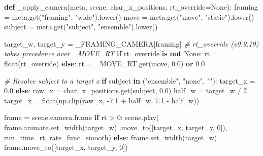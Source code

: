 \documentclass[
  12pt,
  letterpaper,
]{book}
\newenvironment{Shaded}{}{}
\newcommand{\BuiltInTok}[1]{\textcolor[rgb]{0.00,0.50,0.00}{#1}}
\newcommand{\CommentTok}[1]{\textcolor[rgb]{0.38,0.63,0.69}{\textit{#1}}}
\newcommand{\ControlFlowTok}[1]{\textcolor[rgb]{0.00,0.44,0.13}{\textbf{#1}}}
\newcommand{\DecValTok}[1]{\textcolor[rgb]{0.25,0.63,0.44}{#1}}
\newcommand{\FloatTok}[1]{\textcolor[rgb]{0.25,0.63,0.44}{#1}}
\newcommand{\KeywordTok}[1]{\textcolor[rgb]{0.00,0.44,0.13}{\textbf{#1}}}
\newcommand{\NormalTok}[1]{#1}
\newcommand{\OperatorTok}[1]{\textcolor[rgb]{0.40,0.40,0.40}{#1}}
\newcommand{\StringTok}[1]{\textcolor[rgb]{0.25,0.44,0.63}{#1}}
\newcommand{\VariableTok}[1]{\textcolor[rgb]{0.10,0.09,0.49}{#1}}
\begin{document}
\begin{Shaded}
\begin{Highlighting}[]
\KeywordTok{def}\NormalTok{ \_apply\_camera(meta, scene, char\_x\_positions,}
\NormalTok{                   rt\_override}\OperatorTok{=}\VariableTok{None}\NormalTok{):}
\NormalTok{    framing }\OperatorTok{=}\NormalTok{ meta.get(}\StringTok{"framing"}\NormalTok{, }\StringTok{"wide"}\NormalTok{).lower()}
\NormalTok{    move    }\OperatorTok{=}\NormalTok{ meta.get(}\StringTok{"move"}\NormalTok{,    }\StringTok{"static"}\NormalTok{).lower()}
\NormalTok{    subject }\OperatorTok{=}\NormalTok{ meta.get(}\StringTok{"subject"}\NormalTok{, }\StringTok{"ensemble"}\NormalTok{).lower()}

\NormalTok{    target\_w, target\_y }\OperatorTok{=}\NormalTok{ \_FRAMING\_CAMERA[framing]}
    \CommentTok{\# rt\_override (v0.9.19) takes precedence over \_MOVE\_RT}
    \ControlFlowTok{if}\NormalTok{ rt\_override }\KeywordTok{is} \KeywordTok{not} \VariableTok{None}\NormalTok{:}
\NormalTok{        rt }\OperatorTok{=} \BuiltInTok{float}\NormalTok{(rt\_override)}
    \ControlFlowTok{else}\NormalTok{:}
\NormalTok{        rt }\OperatorTok{=}\NormalTok{ \_MOVE\_RT.get(move, }\FloatTok{0.0}\NormalTok{) }\KeywordTok{or} \FloatTok{0.0}

    \CommentTok{\# Resolve subject to a target x}
    \ControlFlowTok{if}\NormalTok{ subject }\KeywordTok{in}\NormalTok{ (}\StringTok{"ensemble"}\NormalTok{, }\StringTok{"none"}\NormalTok{, }\StringTok{""}\NormalTok{):}
\NormalTok{        target\_x }\OperatorTok{=} \FloatTok{0.0}
    \ControlFlowTok{else}\NormalTok{:}
\NormalTok{        raw\_x  }\OperatorTok{=}\NormalTok{ char\_x\_positions.get(subject, }\FloatTok{0.0}\NormalTok{)}
\NormalTok{        half\_w }\OperatorTok{=}\NormalTok{ target\_w }\OperatorTok{/} \DecValTok{2}
\NormalTok{        target\_x }\OperatorTok{=} \BuiltInTok{float}\NormalTok{(np.clip(raw\_x,}
                                 \OperatorTok{{-}}\FloatTok{7.1} \OperatorTok{+}\NormalTok{ half\_w, }\FloatTok{7.1} \OperatorTok{{-}}\NormalTok{ half\_w))}

\NormalTok{    frame }\OperatorTok{=}\NormalTok{ scene.camera.frame}
    \ControlFlowTok{if}\NormalTok{ rt }\OperatorTok{\textgreater{}} \DecValTok{0}\NormalTok{:}
\NormalTok{        scene.play(}
\NormalTok{            frame.animate.set\_width(target\_w)}
\NormalTok{                  .move\_to([target\_x, target\_y, }\DecValTok{0}\NormalTok{]),}
\NormalTok{            run\_time}\OperatorTok{=}\NormalTok{rt, rate\_func}\OperatorTok{=}\NormalTok{smooth)}
    \ControlFlowTok{else}\NormalTok{:}
\NormalTok{        frame.set\_width(target\_w)}
\NormalTok{        frame.move\_to([target\_x, target\_y, }\DecValTok{0}\NormalTok{])}
\end{Highlighting}
\end{Shaded}
\end{document}
